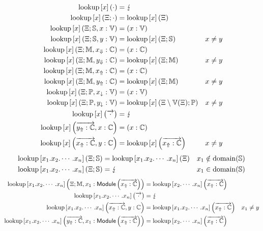 \begin{equation*}
\begin{aligned}
\Lookup{x}{\cdot} &= \Fail\\
\Lookup{x}{\Env; \cdot} &= \Lookup{x}{\Env}\\
\Lookup{x}{\Env; \Scope, x : \Var} &= (x : \Var)\\
\Lookup{x}{\Env; \Scope, y : \Var} &= \Lookup{x}{\Env; \Scope} & x \neq y\\
\Lookup{x}{\Env; \Module, \Private{x} : \Constant} &= (x : \Constant)\\
\Lookup{x}{\Env; \Module, \Private{y} : \Constant} &= \Lookup{x}{\Env; \Module} & x \neq y\\
\Lookup{x}{\Env; \Module, \Public{x} : \Constant} &= (x : \Constant)\\
\Lookup{x}{\Env; \Module, \Public{y} : \Constant} &= \Lookup{x}{\Env; \Module} & x \neq y\\
\Lookup{x}{\Env; \Pattern, \private{x} : \Var} &= (x : \Var)\\
\Lookup{x}{\Env; \Pattern, \private{y} : \Var} &= \Lookup{x}{\Env \setminus \Var(\Env); \Pattern} & x \neq y\\
\Lookup{x}{\overrightarrow{\cdot}} &= \Fail\\
\Lookup{x}{\overrightarrow{\Public{y} : \Constant}, x : \Constant} &= (x : \Constant)\\
\Lookup{x}{\overrightarrow{\Public{x} : \Constant}, y : \Constant} &= \Lookup{x}{\overrightarrow{\Public{x} : \Constant}} & x \neq y
\end{aligned}
\end{equation*}
\begin{equation*}
\begin{aligned}
\Lookup{x_1.x_2.\cdots.x_n}{\Env; \Scope} &= \Lookup{x_1.x_2.\cdots.x_n}{\Env} & x_1 \notin \Domain(\Scope)\\
\Lookup{x_1.x_2.\cdots.x_n}{\Env; \Scope} &= \Fail & x_1 \in \Domain(\Scope)
\end{aligned}
\end{equation*}
\begin{equation*}
\begin{aligned}
\Lookup{x_1.x_2.\cdots.x_n}{\Env; \Module, x_1 : \mathsf{Module}\left(\overrightarrow{\Public{x}:\Constant}\right)} &= \Lookup{x_2.\cdots.x_n}{\overrightarrow{\Public{x}:\Constant}}\\
\Lookup{x_1.x_2.\cdots.x_n}{\overrightarrow{\cdot}} &= \Fail\\
\Lookup{x_1.x_2.\cdots.x_n}{\overrightarrow{\Public{x}:\Constant}, y : \Constant} &= \Lookup{x_1.x_2.\cdots.x_n}{\overrightarrow{\Public{x}:\Constant}} & x_1 \neq y\\
\Lookup{x_1.x_2.\cdots.x_n}{\overrightarrow{\Public{y}:\Constant}, x_1: \mathsf{Module}\left(\overrightarrow{\Public{x}:\Constant}\right)} &= \Lookup{x_2.\cdots.x_n}{\overrightarrow{\Public{x}:\Constant}}
\end{aligned}
\end{equation*}
